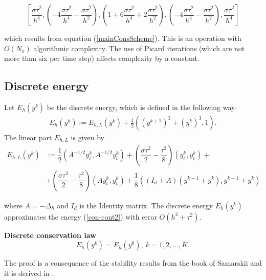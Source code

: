 \documentclass[%
 aip,
cp,  
 amsmath,amssymb,
 reprint,
]{iopconfser}
\newcommand{\rf}[1]{(\ref{#1})}
\begin{document}
$$\left[ \dfrac{\sigma\tau^2}{h^4}, \left(-4\dfrac{\sigma\tau^2}{h^4}-\dfrac{\sigma\tau^2}{h^2}\right), \left(1+6\dfrac{\sigma\tau^2}{h^4}+2\dfrac{\sigma\tau^2}{h^2}\right), \left(-4\dfrac{\sigma\tau^2}{h^4}-\dfrac{\sigma\tau^2}{h^2}\right), \dfrac{\sigma\tau^2}{h^4} \right]$$

which results from equation \rf{mainConsScheme}. This is an operation with $ O( N_x ) $ algorithmic complexity. The use of Picard iterations (which are not more than six per time step) affects complexity by a constant.
\subsection{Discrete energy}

Let $E_h (y^k)$ be the discrete energy, which is defined in the following way:
\begin{eqnarray}\label{energy1}
E_h (y^k):=E_{h,L} (y^k) +\frac{1}{2}((y^{k+1})^3+(y^{k})^3,1).
\end{eqnarray}
The linear part $E_{h,L}$ is given by
\begin{align*}\label{den}
E_{h,L}\left( y^k \right)&:= 
\dfrac{1}{2}\left(A^{-1/2}y_t^k,A^{-1/2}y_t^k\right)+\left(\dfrac{\sigma\tau^2}{2}-\dfrac{\tau^2}{8}\right)\left(y_t^k,y_t^k\right)+\nonumber\\&+\left(\dfrac{\sigma\tau^2}{2}-\dfrac{\tau^2}{8}\right) \left(Ay_t^k,y_t^k\right)
+\dfrac{1}{8}\left(\left(I_d+A\right)\left(y^{k+1}+y^k\right),y^{k+1}+y^k\right)
\end{align*}

where $A=-\Delta_h$ and $I_d$ is the Identity matrix. The discrete energy $E_h (y^k)$ approximates the energy \rf{con-cont2} with error $O(h^2+\tau^2)$.


{\textbf{Discrete conservation law}}
	$$E_h(y^k)=E_h(y^0),~k=1,2,...,K.$$

The proof is a consequence of the stability results from the book of Samarskii \cite{samarski} and it is derived in \cite{consCitat}.
\end{document}
